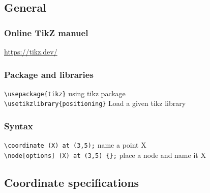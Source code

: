 \subsection{General}
\subsubsection{Online TikZ manuel}
\url{https://tikz.dev/}\\
\subsubsection{Package and libraries}
\verb|\usepackage{tikz}| using tikz package\\
\verb|\usetikzlibrary{positioning}| Load a given tikz library\\
\subsubsection{Syntax}
\verb|\coordinate (X) at (3,5);| name a point X\\
\verb|\node[options] (X) at (3,5) {};| place a node and name it X\\

\subsection{Coordinate specifications}
